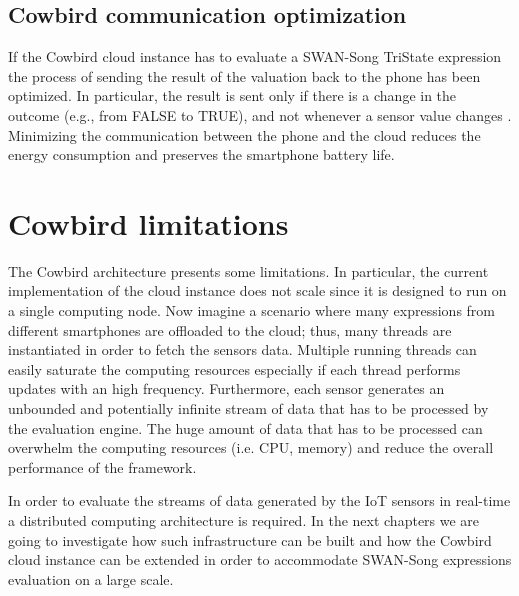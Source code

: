 \subsection{Cowbird communication optimization}
If the Cowbird cloud instance has to evaluate a SWAN-Song TriState expression the process of sending the result of the valuation back to the phone has been optimized. In particular, the result is sent only if there is a change in the outcome (e.g., from FALSE to TRUE), and not whenever a sensor value changes \cite{cowbirdarticle}. Minimizing the communication between the phone and the cloud reduces the energy consumption and preserves the smartphone battery life.
\section{Cowbird limitations}
The Cowbird architecture presents some limitations. In particular, the current implementation of the cloud instance does not scale since it is designed to run on a single computing node. Now imagine a scenario where many expressions from different smartphones are offloaded to the cloud; thus, many threads are instantiated in order to fetch the sensors data. Multiple running threads can easily saturate the computing resources especially if each thread performs updates with an high frequency. Furthermore, each sensor generates an unbounded and potentially infinite stream of data that has to be processed by the evaluation engine. The huge amount of data that has to be processed can overwhelm the computing resources (i.e. CPU, memory) and reduce the overall performance of the framework.

In order to evaluate the streams of data generated by the IoT sensors in real-time a distributed computing architecture is required. In the next chapters we are going to investigate how such infrastructure can be built and how the Cowbird cloud instance can be extended in order to accommodate SWAN-Song expressions evaluation on a large scale.